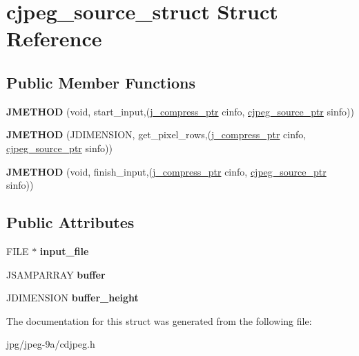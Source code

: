 \hypertarget{structcjpeg__source__struct}{\section{cjpeg\+\_\+source\+\_\+struct Struct Reference}
\label{structcjpeg__source__struct}
}
\subsection*{Public Member Functions}
\begin{DoxyCompactItemize}
\item 
\hypertarget{structcjpeg__source__struct_a0c0027418e48e9cd566807b4c7110aa1}{{\bfseries J\+M\+E\+T\+H\+O\+D} (void, start\+\_\+input,(\hyperlink{structjpeg__compress__struct}{j\+\_\+compress\+\_\+ptr} cinfo, \hyperlink{structcjpeg__source__struct}{cjpeg\+\_\+source\+\_\+ptr} sinfo))}\label{structcjpeg__source__struct_a0c0027418e48e9cd566807b4c7110aa1}

\item 
\hypertarget{structcjpeg__source__struct_adac53dc0fdf95208d2458921ebacb93e}{{\bfseries J\+M\+E\+T\+H\+O\+D} (J\+D\+I\+M\+E\+N\+S\+I\+O\+N, get\+\_\+pixel\+\_\+rows,(\hyperlink{structjpeg__compress__struct}{j\+\_\+compress\+\_\+ptr} cinfo, \hyperlink{structcjpeg__source__struct}{cjpeg\+\_\+source\+\_\+ptr} sinfo))}\label{structcjpeg__source__struct_adac53dc0fdf95208d2458921ebacb93e}

\item 
\hypertarget{structcjpeg__source__struct_a58d0834ab3f3ed64eba2251415744b71}{{\bfseries J\+M\+E\+T\+H\+O\+D} (void, finish\+\_\+input,(\hyperlink{structjpeg__compress__struct}{j\+\_\+compress\+\_\+ptr} cinfo, \hyperlink{structcjpeg__source__struct}{cjpeg\+\_\+source\+\_\+ptr} sinfo))}\label{structcjpeg__source__struct_a58d0834ab3f3ed64eba2251415744b71}

\end{DoxyCompactItemize}
\subsection*{Public Attributes}
\begin{DoxyCompactItemize}
\item 
\hypertarget{structcjpeg__source__struct_a88d55b02438c0a3ce21422aa8578679e}{F\+I\+L\+E $\ast$ {\bfseries input\+\_\+file}}\label{structcjpeg__source__struct_a88d55b02438c0a3ce21422aa8578679e}

\item 
\hypertarget{structcjpeg__source__struct_a2ffe2e6e6af7f434f712295d1760e001}{J\+S\+A\+M\+P\+A\+R\+R\+A\+Y {\bfseries buffer}}\label{structcjpeg__source__struct_a2ffe2e6e6af7f434f712295d1760e001}

\item 
\hypertarget{structcjpeg__source__struct_a01c25aca7ac8fed165b05139aeb1f762}{J\+D\+I\+M\+E\+N\+S\+I\+O\+N {\bfseries buffer\+\_\+height}}\label{structcjpeg__source__struct_a01c25aca7ac8fed165b05139aeb1f762}

\end{DoxyCompactItemize}


The documentation for this struct was generated from the following file\+:\begin{DoxyCompactItemize}
\item 
jpg/jpeg-\/9a/cdjpeg.\+h\end{DoxyCompactItemize}
